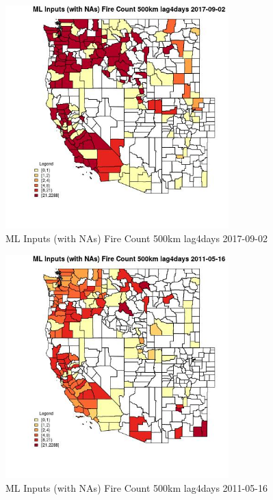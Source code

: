 \begin{figure} 
\centering  
\includegraphics[width=0.77\textwidth]{Code_Outputs/Report_ML_input_PM25_Step4_part_e_de_duplicated_aves_compiled_2019-05-21wNAs_CountyFire_Count_500km_lag4daysMean2017-09-02.jpg} 
\caption{\label{fig:Report_ML_input_PM25_Step4_part_e_de_duplicated_aves_compiled_2019-05-21wNAsCountyFire_Count_500km_lag4daysMean2017-09-02}ML Inputs (with NAs) Fire Count 500km lag4days 2017-09-02} 
\end{figure} 
 

\begin{figure} 
\centering  
\includegraphics[width=0.77\textwidth]{Code_Outputs/Report_ML_input_PM25_Step4_part_e_de_duplicated_aves_compiled_2019-05-21wNAs_CountyFire_Count_500km_lag4daysMean2011-05-16.jpg} 
\caption{\label{fig:Report_ML_input_PM25_Step4_part_e_de_duplicated_aves_compiled_2019-05-21wNAsCountyFire_Count_500km_lag4daysMean2011-05-16}ML Inputs (with NAs) Fire Count 500km lag4days 2011-05-16} 
\end{figure} 
 

